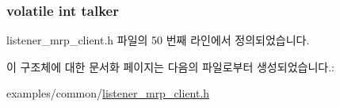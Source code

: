 \subsubsection[{\texorpdfstring{talker}{talker}}]{\setlength{\rightskip}{0pt plus 5cm}volatile int talker}\hypertarget{structmrp__listener__ctx_afd1cfb96f67ad1b881b86ccbbf7af341}{}\label{structmrp__listener__ctx_afd1cfb96f67ad1b881b86ccbbf7af341}


listener\+\_\+mrp\+\_\+client.\+h 파일의 50 번째 라인에서 정의되었습니다.



이 구조체에 대한 문서화 페이지는 다음의 파일로부터 생성되었습니다.\+:\begin{DoxyCompactItemize}
\item 
examples/common/\hyperlink{listener__mrp__client_8h}{listener\+\_\+mrp\+\_\+client.\+h}\end{DoxyCompactItemize}
